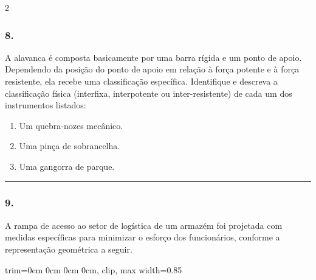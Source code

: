 \documentclass[twoside, 10pt, a4paper]{article}
\newlength{\espacoPreQuestao}
\newlength{\espacoQuestao}
\newlength{\espacoAlt}
\newcommand{\larguraTikz}{0.85\linewidth} %
\begin{document}
\begin{multicols*}{2}
\subsubsection*{8.} A alavanca é composta basicamente por uma barra rígida e um ponto de apoio. Dependendo da posição do ponto de apoio em relação à força potente e à força resistente, ela recebe uma classificação específica. Identifique e descreva a classificação física (interfixa, interpotente ou inter-resistente) de cada um dos instrumentos listados:
\begin{enumerate}[label=\Roman*., itemsep=\espacoAlt]
    \item Um quebra-nozes mecânico.
    \item Uma pinça de sobrancelha.
    \item Uma gangorra de parque.
\end{enumerate}
\par\vspace{\espacoQuestao}

\noindent\textcolor{CorLinha}{\rule{\linewidth}{0.5pt}} 
\par\vspace{\espacoPreQuestao}
\subsubsection*{9.} A rampa de acesso ao setor de logística de um armazém foi projetada com medidas específicas para minimizar o esforço dos funcionários, conforme a representação geométrica a seguir.
\begin{center}
\begin{adjustbox}{trim=0cm 0cm 0cm 0cm, clip, max width=\larguraTikz}
\end{adjustbox}
\end{center}
\end{multicols*}
\end{document}
